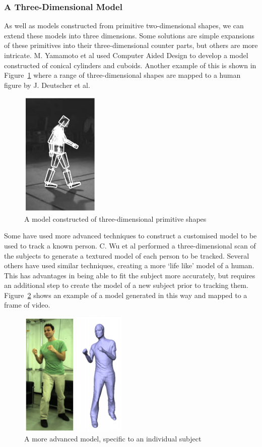 \subsubsection{A Three-Dimensional Model}

As well as models constructed from primitive two-dimensional shapes, we can extend these models into three dimensions. Some solutions are simple expansions of these primitives into their three-dimensional counter parts, but others are more intricate. M. Yamamoto et al used Computer Aided Design to develop a model constructed of conical cylinders and cuboids\cite{cadmodel}. Another example of this is shown in Figure~\ref{fig:3dmodelajd} where a range of three-dimensional shapes are mapped to a human figure by J. Deutscher et al.

\begin{figure}[H]
    \centering
    \includegraphics[height=6cm]{background/images/3dpolygon}

	\caption{A model constructed of three-dimensional primitive shapes\cite{stickfigure}}
	\label{fig:3dmodelajd}
\end{figure}

Some have used more advanced techniques to construct a customised model to be used to track a known person. C. Wu et al performed a three-dimensional scan of the subjects to generate a textured model of each person to be tracked\cite{capturystereopaper}. Several others have used similar techniques, creating a more `life like' model of a human. This has advantages in being able to fit the subject more accurately, but requires an additional step to create the model of a new subject prior to tracking them. Figure~\ref{fig:3dtexturedmodel} shows an example of a model generated in this way and mapped to a frame of video.

\begin{figure}[H]
    \centering
    \includegraphics[height=6cm]{background/images/3dtexture}

	\caption{A more advanced model, specific to an individual subject\cite{capturystereopaper}}
	\label{fig:3dtexturedmodel}
\end{figure}